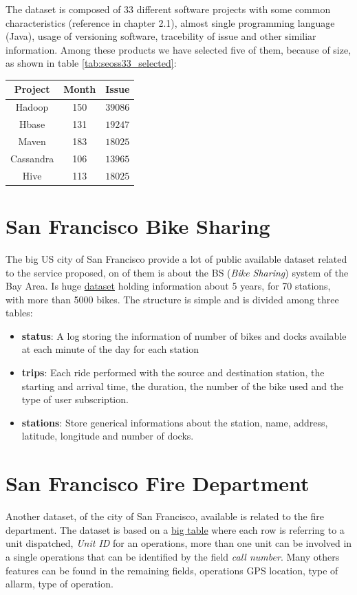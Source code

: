 \documentclass[%
    corpo=12pt,
    twoside,
    oldstyle,
    autoretitolo,
    greek,
    evenboxes,
]{toptesi}
\begin{document}
The dataset is composed of 33 different software projects with some common characteristics (reference in  \cite{SEOSS33} chapter 2.1), almost single programming language (Java), usage of versioning software, tracebility of issue and other similiar information. Among these products we have selected five of them, because of size, as shown in table \ref{tab:seoss33_selected}:

\begin{center}
   \label{tab:seoss33_selected}
  \begin{tabular}{ |c|c|c| }
     \hline
     \textbf{Project} & \textbf{Month} & \textbf{Issue} \\
     \hline
     \hline
     Hadoop & 150 & $39086$ \\
     Hbase & 131 & $19247$ \\
     Maven & 183 & $18025$ \\
     Cassandra & 106 & $13965$ \\
     Hive & 113 & $18025$ \\
     \hline
  \end{tabular}
\end{center}


\section{San Francisco Bike Sharing}
The big US city of San Francisco provide a lot of public available dataset related to the service proposed, on of them is about the BS (\textit{Bike Sharing}) system of the Bay Area. Is huge \href{https://www.kaggle.com/datasf/san-francisco}{dataset} holding information about 5 years, for 70 stations, with more than 5000 bikes.
The structure is simple and is divided among three tables:
\begin{itemize}
  \item \textbf{status}: A log storing the information of number of bikes and docks available at each minute of the day for each station
  \item \textbf{trips}: Each ride performed with the source and destination station, the starting and arrival time, the duration, the number of the bike used and the type of user subscription.
  \item \textbf{stations}: Store generical informations about the station, name, address, latitude, longitude and number of docks.
\end{itemize}

\section{San Francisco Fire Department}
Another dataset, of the city of San Francisco, available is related to the fire department. The dataset is based on a \href{https://data.sfgov.org/widgets/nuek-vuh3}{big table} where each row is referring to a unit dispatched, \textit{Unit ID} for an operations, more than one unit can be involved in a single operations that can be identified by the field \textit{call number}. Many others features can be found in the remaining fields, operations GPS location, type of allarm, type of operation.
\end{document}

